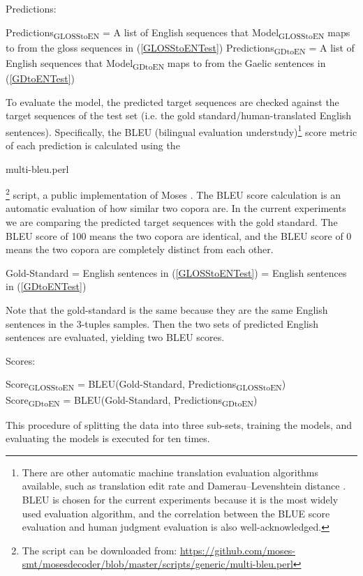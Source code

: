 \documentclass[a4paper]{article}
\begin{document}
\begin{exe}
\ex Predictions: 
	\begin{xlist}
	\ex Predictions\textsubscript{GLOSStoEN} = A list of English sequences that Model\textsubscript{GLOSStoEN} maps to from the gloss sequences in (\ref{GLOSStoENTest}) 
	\ex Predictions\textsubscript{GDtoEN} = A list of English sequences that Model\textsubscript{GDtoEN} maps to from the Gaelic sentences in (\ref{GDtoENTest}) 
	\end{xlist}	
\end{exe}

To evaluate the model, the predicted target sequences are checked against the target sequences of the test set (i.e. the gold standard/human-translated English sentences). Specifically, the BLEU (bilingual evaluation understudy)\footnote{There are other automatic machine translation evaluation algorithms available, such as translation edit rate \citep{Snover06astudy} and Damerau–Levenshtein distance \citep{damerau1964technique, levenshtein1966binary}. BLEU is chosen for the current experiments because it is the most widely used evaluation algorithm, and the correlation between the BLUE score evaluation and human judgment evaluation is also well-acknowledged.} score metric \citep{bleu} of each prediction is calculated using the \begin{myfont} multi-bleu.perl\end{myfont}\footnote{The script can be downloaded from: \url{https://github.com/moses-smt/mosesdecoder/blob/master/scripts/generic/multi-bleu.perl}} 
script, a public implementation of Moses \citep{moses}. The BLEU score calculation is an automatic evaluation of how similar two copora are. In the current experiments we are comparing the predicted target sequences with the gold standard. The BLEU score of 100 means the two copora are identical, and the BLEU score of 0 means the two copora are completely distinct from each other.

\begin{exe}
\ex Gold-Standard = English sentences in (\ref{GLOSStoENTest}) = English sentences in (\ref{GDtoENTest})
\end{exe}
Note that the gold-standard is the same because they are the same English sentences in the 3-tuples samples. Then the two sets of predicted English sentences are evaluated, yielding two BLEU scores.   

\begin{exe}
\ex Scores: \\
  \begin{xlist}
	\ex Score\textsubscript{GLOSStoEN} = BLEU(Gold-Standard, Predictions\textsubscript{GLOSStoEN}) \\
	\ex Score\textsubscript{GDtoEN} = BLEU(Gold-Standard, Predictions\textsubscript{GDtoEN}) \\
  \end{xlist}
\end{exe}
This procedure of splitting the data into three sub-sets, training the models, and evaluating the models is executed for ten times. 
\end{document}
